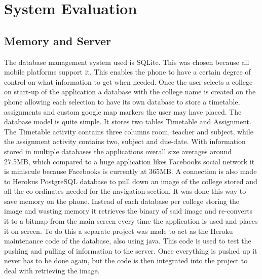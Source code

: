 \chapter{System Evaluation}
\section{Memory and Server}
The database management system used is SQLite. This was chosen because all mobile platforms support it. This enables the phone to have a certain degree of control on what information to get when needed. Once the user selects a college on start-up of the application a database with the college name is created on the phone allowing each selection to have its own database to store a timetable, assignments and custom google map markers the user may have placed. The database model is quite simple. It stores two tables Timetable and Assignment. The Timetable activity contains three columns room, teacher and subject, while the assignment activity contains two, subject and due-date. With information stored in multiple databases the applications overall size averages around 27.5MB, which compared to a huge application likes Facebooks social network it is miniscule because Facebooks is currently at 365MB. 
A connection is also made to Herokus PostgreSQL database to pull down an image of the college stored and all the co-ordinates needed for the navigation section. It was done this way to save memory on the phone. Instead of each database per college storing the image and wasting memory it retrieves the binary of said image and re-converts it to a bitmap from the main screen every time the application is used and places it on screen. To do this a separate project was made to act as the Heroku maintenance code of the database, also using java. This code is used to test the pushing and pulling of information to the server. Once everything is pushed up it never has to be done again, but the code is then integrated into the project to deal with retrieving the image.

